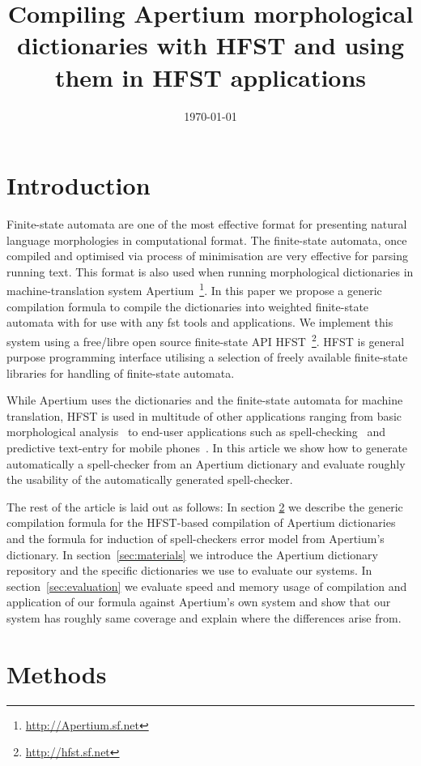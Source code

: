 \documentclass[10pt,a4paper]{article}
\title{Compiling Apertium morphological dictionaries with HFST and using them
in HFST applications}
\date{\today}
\begin{document}
\maketitleabstract

\section{Introduction}

Finite-state automata are one of the most effective format for presenting
natural language morphologies in computational format. The finite-state
automata, once compiled and optimised via process of minimisation are very
effective for parsing running text. This format is also used when running
morphological dictionaries in machine-translation system
Apertium~\cite{Apertium/2011}\footnote{\url{http://Apertium.sf.net}}. In this
paper we propose a generic compilation formula  to compile the
dictionaries into weighted finite-state automata with for use with any fst
tools and applications.  We implement this system using a free/libre
open source finite-state API
HFST~\cite{hfst/2011}\footnote{\url{http://hfst.sf.net}}. HFST is general
purpose programming interface utilising a selection of freely available
finite-state libraries for handling of finite-state automata.

While Apertium uses the dictionaries and the finite-state automata for machine
translation, HFST is used in multitude of other applications ranging from
basic morphological analysis~\cite{hfst/2011}
to end-user applications such as spell-checking~\cite{pirinen/2010/lrec} and
predictive text-entry for mobile phones~\cite{silfverberg/2011/cla}. In this
article we show how to generate automatically a spell-checker from an Apertium
dictionary and evaluate roughly the usability of the automatically generated
spell-checker.

The rest of the article is laid out as follows: In section \ref{sec:methods}
we describe the generic compilation formula for the HFST-based compilation of
Apertium dictionaries and the formula for induction of spell-checkers error
model from Apertium's dictionary. In section~\ref{sec:materials} we introduce
the Apertium dictionary repository and the specific dictionaries we use to
evaluate our systems. In section~\ref{sec:evaluation} we evaluate speed and
memory usage of compilation and application of our formula against Apertium's
own system and show that our system has roughly same coverage and explain
where the differences arise from.


\section{Methods}
\label{sec:methods}
\end{document}
